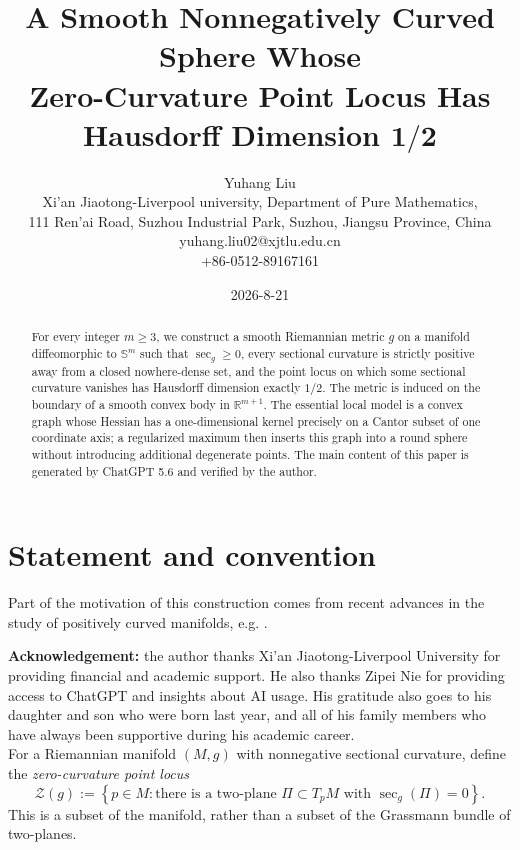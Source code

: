\documentclass[11pt]{amsart}
\title{A Smooth Nonnegatively Curved Sphere Whose\\Zero-Curvature Point Locus Has Hausdorff Dimension \texorpdfstring{$\boldsymbol{1/2}$}{1/2}}
\author{Yuhang Liu\\Xi'an Jiaotong-Liverpool university, Department of Pure Mathematics, \\111 Ren'ai Road, Suzhou Industrial Park, Suzhou, Jiangsu Province, China\\yuhang.liu02@xjtlu.edu.cn\\
+86-0512-89167161}
\date{2026-8-21}
\theoremstyle{remark}
\newcommand{\R}{\mathbb R}
\newcommand{\Sph}{\mathbb S}
\newcommand{\secg}{\operatorname{sec}_g}
\begin{document}
\maketitle
\vspace{-1.2em}

\begin{abstract}
For every integer $m\geq 3$, we construct a smooth Riemannian metric $g$ on a manifold diffeomorphic to $\Sph^m$ such that $\secg\geq0$, every sectional curvature is strictly positive away from a closed nowhere-dense set, and the point locus on which some sectional curvature vanishes has Hausdorff dimension exactly $1/2$. The metric is induced on the boundary of a smooth convex body in $\R^{m+1}$.  The essential local model is a convex graph whose Hessian has a one-dimensional kernel precisely on a Cantor subset of one coordinate axis; a regularized maximum then inserts this graph into a round sphere without introducing additional degenerate points. The main content of this paper is generated by ChatGPT 5.6 and verified by the author.
\end{abstract}

\section{Statement and convention}
Part of the motivation of this construction comes from recent advances in the study of positively curved manifolds, e.g. \cite{Kennard, AnushaWiemeler, Liu}.

\textbf{Acknowledgement:} the author thanks Xi'an Jiaotong-Liverpool University for providing financial and academic support. He also thanks Zipei Nie for providing access to ChatGPT and insights about AI usage. His gratitude also goes to his daughter and son who were born last year, and all of his family members who have always been supportive during his academic career.\\

For a Riemannian manifold $(M,g)$ with nonnegative sectional curvature, define the \emph{zero-curvature point locus}
\[
 \mathcal Z(g)
 :=\left\{p\in M:\text{there is a two-plane }\Pi\subset T_pM
 \text{ with }\secg(\Pi)=0\right\}.
\]
This is a subset of the manifold, rather than a subset of the Grassmann bundle of two-planes.\\
\end{document}
